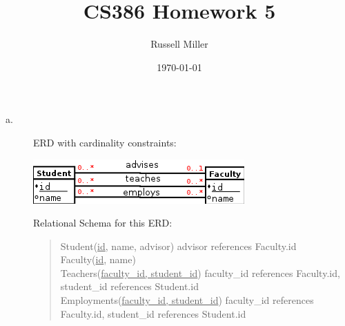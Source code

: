 \documentclass{article}
\title{CS386 Homework 5}
\author{Russell Miller}
\date{\today}
\begin{document}
\maketitle

\section{}
\begin{description}
\item[a.]
ERD with cardinality constraints:\footnotemark\\
\begin{center}
 \includegraphics[scale=.8]{1a.png}
\end{center}
Relational Schema for this ERD:
\begin{quote}
Student(\underline{id}, name, advisor) advisor references Faculty.id\\
Faculty(\underline{id}, name)\\
Teachers(\underline{faculty\_id, student\_id}) faculty\_id references Faculty.id, student\_id 
references Student.id\\
Employments(\underline{faculty\_id, student\_id}) faculty\_id references Faculty.id, student\_id 
references Student.id\\
\end{quote}
\end{description}
\end{document}
